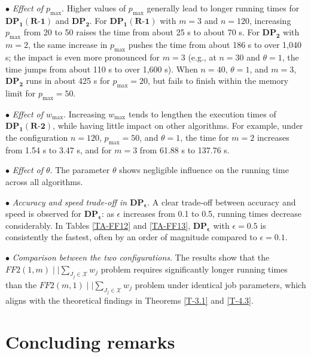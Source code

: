 \documentclass[12pt, eqno, limlimits]{article}
\begin{document}
\begin{sloppypar}
        $\bullet$ \textit{Effect of $p_{\max}$}. Higher values of $p_{\max}$ generally lead to longer running times for  $\mathbf{DP_1(R\text{-}1)}$ and $\mathbf{DP_2}$. For $\mathbf{DP_1(R\text{-}1)}$ with $m=3$ and $n=120$, increasing $p_{\max}$ from 20 to 50 raises the time from about 25 s to about 70 s. For $\mathbf{DP_2}$ with $m=2$, the same increase in $p_{\max}$ pushes the time from about 186 s to over 1,040 s; the impact is even more pronounced for $m=3$ (e.g., at $n=30$ and $\theta=1$, the time jumps from about 110 s to over 1,600 s). When $n=40$, $\theta=1$, and $m=3$,  $\mathbf{DP_2}$ runs in about 425 s for $p_{\max}=20$, but fails to finish within the memory limit for $p_{\max}=50$. 
        
        $\bullet$ \textit{Effect of $w_{\max}$}. Increasing $w_{\max}$ tends to lengthen the execution times of  $\mathbf{DP_1(R\text{-}2)}$, while having little impact on other algorithms. For example, under the configuration $n=120$, $p_{\max}=50$, and $\theta=1$, the time for $m=2$ increases from 1.54 s to 3.47 s, and for $m=3$ from 61.88 s to 137.76 s.
        
        $\bullet$ \textit{Effect of $\theta$}. The parameter $\theta$ shows negligible influence on the running time across all algorithms.
        
        $\bullet$ \textit{Accuracy and speed trade-off in $\mathbf{DP_{\epsilon}}$}. A clear trade-off between accuracy and speed is observed for $\mathbf{DP_{\epsilon}}$: as $\epsilon$ increases from 0.1 to 0.5, running times decrease considerably. In Tables \ref{TA-FF12} and \ref{TA-FF13}, $\mathbf{DP_{\epsilon}}$ with $\epsilon=0.5$ is consistently the fastest, often by an order of magnitude compared to $\epsilon=0.1$.
        
        $\bullet$ \textit{Comparison between the two configurations}. The results show that the $FF2(1, m) \mid  \mid \sum_{J_j \in \mathcal{X}} w_j$ problem requires significantly longer running times than the $FF2(m, 1) \mid  \mid \sum_{J_j \in \mathcal{X}} w_j$ problem under identical job parameters, which aligns with the theoretical findings in Theorems \ref{T-3.1} and \ref{T-4.3}.
        
        
        \section{Concluding remarks}
        

\end{sloppypar}
\end{document}
